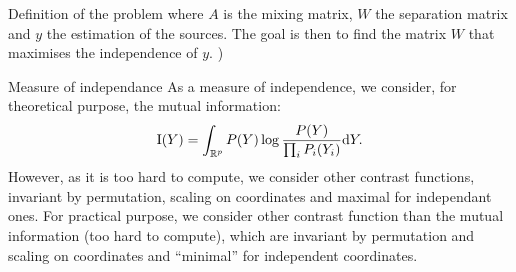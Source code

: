 \documentclass{beamer}
\newcommand{\zZ}[2]{\mathrm #1\!\zp{#2}}
\begin{document}
\begin{frame}{}
\begin{columns}[T]
\begin{column}{.48\linewidth}
\begin{block}{Definition of the problem}
where $A$ is the mixing matrix, $W$ the separation matrix and $y$ the
estimation of the sources. The goal is then to find the matrix $W$ that
maximises the independence of $y$.
	 )
\end{block}
\begin{block}{Measure of independance}
As a measure of independence, we consider, for theoretical purpose,
the mutual information:\begin{equation}
\zZ IY = \int_{\zR^p} P(Y) \log\frac{P(Y)}{\prod_i P_i(Y_i)} \zdx Y.
\end{equation}
However, as it is too hard to compute, we consider other contrast functions, invariant by permutation, scaling on coordinates and maximal for independant ones.
For practical purpose, we consider other contrast function than the
mutual information (too hard to compute), which are invariant by permutation
and scaling on coordinates and ``minimal'' for independent coordinates.
\end{block}
\end{column}
\end{columns}
\end{frame}
\end{document}
